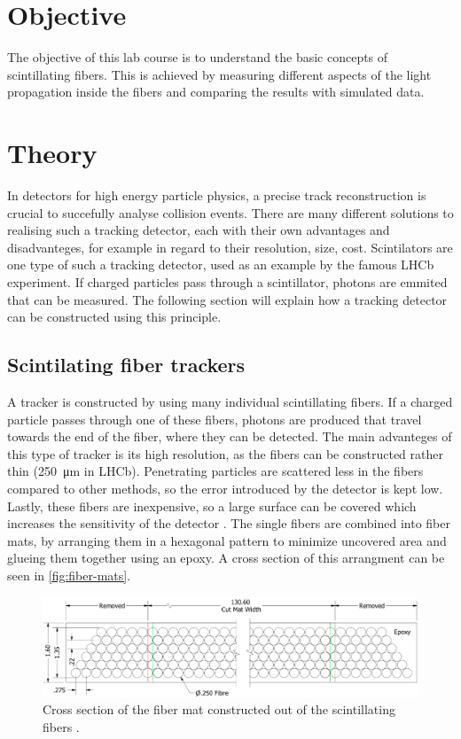 \section{Objective}
\label{sec:Objective}

The objective of this lab course is to understand the basic concepts of scintillating fibers.
This is achieved by measuring different aspects of the light propagation inside the fibers and comparing the results
with simulated data.

\section{Theory}
\label{sec:Theory}

In detectors for high energy particle physics, a precise track reconstruction is crucial to succefully analyse collision events.
There are many different solutions to realising such a tracking detector, each with their own advantages and disadvanteges, for example
in regard to their resolution, size, cost. Scintilators are one type of such a tracking detector, used as an example by the famous
LHCb experiment. If charged particles pass through a scintillator, photons are emmited that can be measured. The following section will explain
how a tracking detector can be constructed using this principle.

\subsection{Scintilating fiber trackers}

A tracker is constructed by using many individual scintillating fibers. If a charged particle passes through one of these fibers, photons are produced that
travel towards the end of the fiber, where they can be detected. The main advanteges of this type of tracker is its high resolution, as the fibers can
be constructed rather thin (\qty{250}{\micro\meter} in LHCb). Penetrating particles are scattered less in the fibers compared to other methods,
so the error introduced by the detector is kept low. Lastly, these fibers are inexpensive, so a large surface can be covered which increases
the sensitivity of the detector \cite{SciFi}.
The single fibers are combined into fiber mats, by arranging them in a hexagonal pattern to minimize uncovered area and glueing
them together using an epoxy. A cross section of this arrangment can be seen in \autoref{fig:fiber-mats}.

\begin{figure}[H]
	\centering
	\includegraphics[width=0.9\linewidth]{pics/fiber_mat.png}
	\caption{Cross section of the fiber mat constructed out of the scintillating fibers \cite{SciFi}.}
	\label{fig:fiber-mats}
\end{figure}

